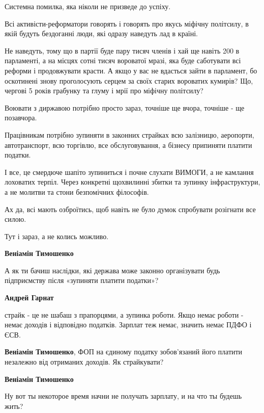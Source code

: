 \begin{itemize}
\begin{itemize}
\end{itemize} %


Системна помилка, яка ніколи не призведе до успіху.

Всі активісти-реформатори говорять і говорять про якусь міфічну політсилу, в
якій будуть бездоганні люди, які одразу наведуть лад в країні.

Не наведуть, тому що в партії буде пару тисяч членів і хай ще навіть 200 в
парламенті, а на місцях сотні тисяч вороватої мразі, яка буде саботувати всі
реформи і продовжувати красти. А якщо у вас не вдасться зайти в парламент, бо
оскотинені знову проголосують серцем за своїх старих вороватих кумирів? Що,
чергові 5 років грабунку та глуму і мрії про міфічну політсилу?

Воювати з диржавою потрібно просто зараз, точніше ще вчора, точніше - ще
позавчора.

Працівникам потрібно зупиняти в законних страйках всю залізницю, аеропорти,
автотранспорт, всю торгівлю, все обслуговування, а бізнесу припиняти платити
податки.

І все, це смердюче шапіто зупиниться і почне слухати ВИМОГИ, а не камлання
лоховатих терпіл. Через конкретні щохвилинні збитки та зупинку інфраструктури,
а не молитви та стони безпомічних філософів.

Ах да, всі мають озброїтись, щоб навіть не було думок спробувати розігнати все
силою.

Тут і зараз, а не колись можливо.

\begin{itemize} %
\textbf{Веніамін Тимошенко}

А як ти бачиш наслідки, які держава може законно організувати будь підприємству
після «зупиняти платити податки»?

\textbf{Андрей Гарнат} 

страйк - це не шабаш з прапорцями, а зупинка роботи. Якщо немає роботи - немає
доходів і відповідно податків. Зарплат теж немає, значить немає ПДФО і ЄСВ.

\textbf{Веніамін Тимошенко}, ФОП на єдиному податку зобов'язаний його платити незалежно від отриманих доходів. Як страйкувати?

\textbf{Веніамін Тимошенко}

Ну вот ты некоторое время начни не получать зарплату, и на что ты будешь жить?


\end{itemize}
\end{itemize}
